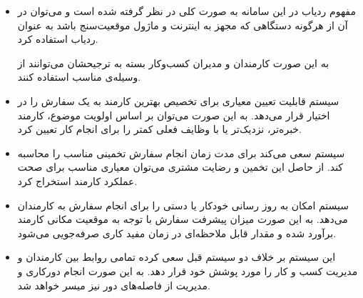 \begin{itemize}
\item 
مفهوم ردیاب در این سامانه به صورت کلی در نظر گرفته شده است و می‌توان در آن از هرگونه دستگاهی که مجهز به اینترنت و ماژول موقعیت‌سنج باشد به عنوان ردیاب استفاده کرد.

به این صورت کارمندان و مدیران کسب‌وکار بسته به ترجیحشان می‌توانند از وسیله‌ی مناسب استفاده کنند.

\item
سیستم قابلیت تعیین معیاری برای تخصیص بهترین کارمند به یک سفارش را در اختیار قرار می‌دهد. به این صورت می‌توان بر اساس اولویت موضوع، کارمند خبره‌تر، نزدیک‌تر یا با وظایف فعلی کمتر را برای انجام کار تعیین کرد.

\item
سیستم سعی می‌کند برای مدت زمان انجام سفارش تخمینی مناسب را محاسبه کند. از حاصل این تخمین و رضایت مشتری می‌توان معیاری مناسب برای صحت عملکرد کارمند استخراج کرد.

\item
سیستم امکان به روز رسانی خودکار یا دستی را برای انجام سفارش به کارمندان  می‌دهد. به این صورت میزان پیشرفت سفارش با توجه به موقعیت مکانی کارمند برآورد شده و مقدار قابل ملاحظه‌ای  در زمان مفید کاری صرفه‌جویی می‌شود.

\item 
این سیستم بر خلاف دو سیستم قبل سعی کرده تمامی روابط بین کارمندان و مدیریت کسب و کار را مورد پوشش خود قرار دهد. به این صورت انجام دورکاری و مدیریت از فاصله‌های دور نیز میسر خواهد شد.

\end{itemize}